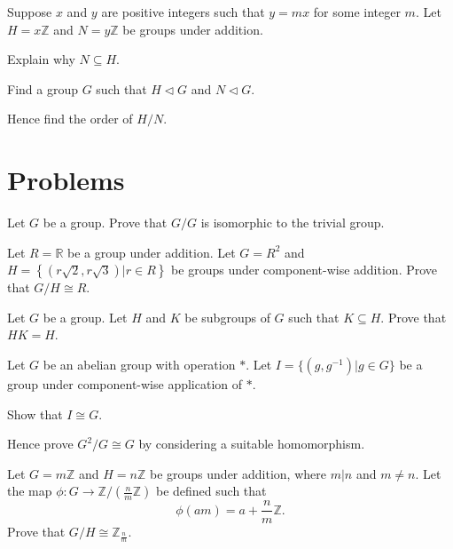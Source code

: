 \begin{exercise}
    Suppose $x$ and $y$ are positive integers such that $y = mx$ for some integer $m$. Let $H = x\mathbb{Z}$ and $N = y\mathbb{Z}$ be groups under addition.
    \begin{partquestions}{\roman*}
        \item Explain why $N \subseteq H$.
        \item Find a group $G$ such that $H \lhd G$ and $N \lhd G$.
        \item Hence find the order of $H/N$.
    \end{partquestions}
\end{exercise}

\newpage

\section{Problems}
\begin{problem}
    Let $G$ be a group. Prove that $G/G$ is isomorphic to the trivial group.
\end{problem}

\begin{problem}
    Let $R = \mathbb{R}$ be a group under addition. Let $G = R^2$ and $H = \left\{(r\sqrt2, r\sqrt3) \vert r\in R\right\}$ be groups under component-wise addition. Prove that $G/H \cong R$.
\end{problem}

\begin{problem}\label{problem-subgroup-product-equal-to-subgroup-if-one-is-subgroup-of-another}
    Let $G$ be a group. Let $H$ and $K$ be subgroups of $G$ such that $K \subseteq H$. Prove that $HK = H$.
\end{problem}

\begin{problem}\label{problem-cartesian-product-of-group-by-group-isomorphic-to-group}
    Let $G$ be an abelian group with operation $\ast$. Let $I = \{(g, g^{-1}) \vert g \in G\}$ be a group under component-wise application of $\ast$.
    \begin{partquestions}{\roman*}
        \item Show that $I \cong G$.
        \item Hence prove $G^2/G \cong G$ by considering a suitable homomorphism.
    \end{partquestions}
\end{problem}

\begin{problem}\label{problem-mZ/nZ-isomorphic-to-Zn/m}
    Let $G = m\mathbb{Z}$ and $H = n\mathbb{Z}$ be groups under addition, where $m\vert n$ and $m \neq n$. Let the map $\phi: G \to \mathbb{Z}/({\frac nm}\mathbb{Z})$ be defined such that
    \[
        \phi(am) = a + \frac nm \mathbb{Z}.
    \]
    Prove that $G/H \cong \mathbb{Z}_{\frac nm}$.
\end{problem}
